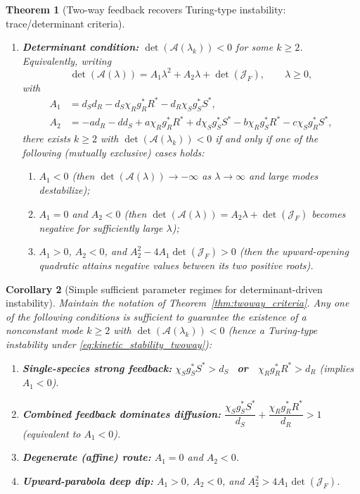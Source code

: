 \documentclass[pdflatex,sn-mathphys-ay]{sn-jnl}
\theoremstyle{thmstyleone}
\newtheorem{theorem}{Theorem}[section]
\newtheorem{corollary}[theorem]{Corollary}
\theoremstyle{definition}
\theoremstyle{remark}
\begin{document}
\begin{theorem}[Two-way feedback recovers Turing-type instability: trace/determinant criteria]
\begin{enumerate}[label=(\alph*), leftmargin=*]
\item \textbf{Determinant condition:}
$\det(\mathcal{A}(\lambda_k))<0$ for some $k\ge2$.
Equivalently, writing
\begin{equation}
\label{eq:det_quadratic_def}
\det(\mathcal{A}(\lambda))=A_1\lambda^2+A_2\lambda+\det(\mathcal{J}_F),
\qquad \lambda\ge0,
\end{equation}
with
\begin{align}
\label{eq:A1A2_def}
A_{1}
&= d_{S}d_{R}-d_{S}\chi_{R}g_R^*R^*-d_{R}\chi_{S}g_S^*S^*,\nonumber\\
A_{2}
&= -ad_{R}-dd_{S}
+a\chi_{R}g_R^*R^* + d\chi_{S}g_S^*S^*
-b\chi_{R}g_S^*R^* -c\chi_{S}g_R^*S^*,
\end{align}
there exists $k\ge2$ with $\det(\mathcal{A}(\lambda_k))<0$ if and only if one of the following (mutually exclusive) cases holds:
\begin{enumerate}[label=(\roman*), leftmargin=*]
\item $A_1<0$ (then $\det(\mathcal{A}(\lambda))\to -\infty$ as $\lambda\to\infty$ and large modes destabilize);
\item $A_1=0$ and $A_2<0$ (then $\det(\mathcal{A}(\lambda))=A_2\lambda+\det(\mathcal{J}_F)$ becomes negative for sufficiently large $\lambda$);
\item $A_1>0$, $A_2<0$, and $A_2^2-4A_1\det(\mathcal{J}_F)>0$ (then the upward-opening quadratic attains negative values between its two positive roots).
\end{enumerate}
\end{enumerate}
\end{theorem}

\begin{corollary}[Simple sufficient parameter regimes for determinant-driven instability]
\label{cor:twoway_simple_regimes}
Maintain the notation of Theorem~\ref{thm:twoway_criteria}.
Any one of the following conditions is sufficient to guarantee the existence of a nonconstant mode $k\ge2$ with
$\det(\mathcal{A}(\lambda_k))<0$ (hence a Turing-type instability under \eqref{eq:kinetic_stability_twoway}):
\begin{enumerate}[label=(S\arabic*), leftmargin=*]
\item \textbf{Single-species strong feedback:}\quad
$\chi_S g_S^* S^* > d_S$ \ \textbf{or}\ \ $\chi_R g_R^* R^* > d_R$ \quad (implies $A_1<0$).

\item \textbf{Combined feedback dominates diffusion:}\quad
$\dfrac{\chi_S g_S^* S^*}{d_S}+\dfrac{\chi_R g_R^* R^*}{d_R}>1$ \quad (equivalent to $A_1<0$).

\item \textbf{Degenerate (affine) route:}\quad
$A_1=0$ and $A_2<0$.

\item \textbf{Upward-parabola deep dip:}\quad
$A_1>0$, $A_2<0$, and $A_2^{2} > 4A_1\det(\mathcal{J}_F)$.
\end{enumerate}
\end{corollary}
\end{document}
